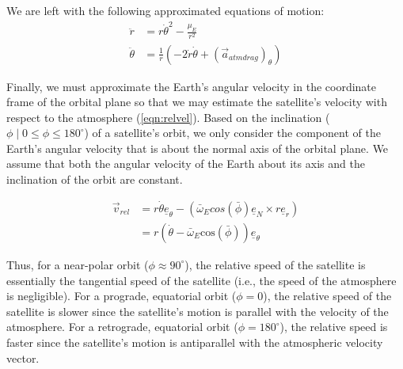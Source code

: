 \documentclass[letterpaper, 10 pt, conference]{ieeeconf}  %
\begin{document}
We are left with the following approximated equations of motion:
\begin{subequations}
\begin{align}
\ddot{r} &= r\dot{\theta}^2 - \frac{\mu_{\scriptscriptstyle E}}{r^2} \\
\ddot{\theta} &= \frac{1}{r} \left( -2\dot{r}\dot{\theta} + (\vec{a}_{atmdrag})_{\theta} \right)
\end{align}
\end{subequations}

Finally, we must approximate the Earth's angular velocity in the coordinate frame of the orbital plane so that we may estimate the satellite's velocity with respect to the atmosphere (\ref{eqn:relvel}). Based on the inclination ($\phi \mid 0\leq \phi \leq 180^\circ$) of a satellite's orbit, we only consider the component of the Earth's angular velocity that is about the normal axis of the orbital plane. We assume that both the angular velocity of the Earth about its axis and the inclination of the orbit are constant.
\iffalse
\begin{subequations}
\begin{align} 
\vec{v}_{rel} &= r\dot{\theta}\underline{e}_{\theta} - \left(\omega_{\scriptscriptstyle E}cos(\phi) \underline{e}_{N} \times r \underline{e}_{r} \right) \\
                    &= r\left( \dot{\theta}-\omega_{\scriptscriptstyle E}\text{cos}(\phi) \right) \underline{e}_{\theta}
\end{align}
\end{subequations}
\fi
\begin{subequations}
\begin{align} 
\vec{v}_{rel} &= r\dot{\theta}\underline{e}_{\theta} - \left(\bar{\omega}_{\scriptscriptstyle E}cos(\bar{\phi}) \underline{e}_{N} \times r \underline{e}_{r} \right) \\
                    &= r\left( \dot{\theta}-\bar{\omega}_{\scriptscriptstyle E}\text{cos}(\bar{\phi}) \right) \underline{e}_{\theta}
\end{align}
\end{subequations}

Thus, for a near-polar orbit ($\phi \approx 90^\circ$), the relative speed of the satellite is essentially the tangential speed of the satellite (i.e., the speed of the atmosphere is negligible). For a prograde, equatorial orbit ($\phi=0$), the relative speed of the satellite is slower since the satellite's motion is parallel with the velocity of the atmosphere. For a retrograde, equatorial orbit ($\phi=180^\circ$), the relative speed is faster since the satellite's motion is antiparallel with the atmospheric velocity vector.
 
\end{document}

